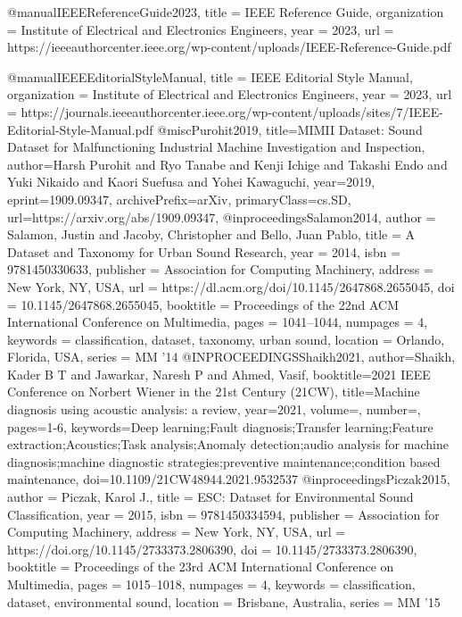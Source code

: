 @manual{IEEEReferenceGuide2023,
  title        = {IEEE Reference Guide},
  organization = {Institute of Electrical and Electronics Engineers},
  year         = {2023},
  url          = {https://ieeeauthorcenter.ieee.org/wp-content/uploads/IEEE-Reference-Guide.pdf}
}

@manual{IEEEEditorialStyleManual,
  title        = {IEEE Editorial Style Manual},
  organization = {Institute of Electrical and Electronics Engineers},
  year         = {2023},
  url          = {https://journals.ieeeauthorcenter.ieee.org/wp-content/uploads/sites/7/IEEE-Editorial-Style-Manual.pdf}
}
@misc{Purohit2019,
    title={MIMII Dataset: Sound Dataset for Malfunctioning Industrial Machine Investigation and Inspection}, 
    author={Harsh Purohit and Ryo Tanabe and Kenji Ichige and Takashi Endo and Yuki Nikaido and Kaori Suefusa and Yohei Kawaguchi},
    year={2019},
    eprint={1909.09347},
    archivePrefix={arXiv},
    primaryClass={cs.SD},
    url={https://arxiv.org/abs/1909.09347}, 
}%
@inproceedings{Salamon2014,
    author = {Salamon, Justin and Jacoby, Christopher and Bello, Juan Pablo},
    title = {A Dataset and Taxonomy for Urban Sound Research},
    year = {2014},
    isbn = {9781450330633},
    publisher = {Association for Computing Machinery},
    address = {New York, NY, USA},
    url = {https://dl.acm.org/doi/10.1145/2647868.2655045},
    doi = {10.1145/2647868.2655045},
    booktitle = {Proceedings of the 22nd ACM International Conference on Multimedia},
    pages = {1041–1044},
    numpages = {4},
    keywords = {classification, dataset, taxonomy, urban sound},
    location = {Orlando, Florida, USA},
    series = {MM '14}   
}%
@INPROCEEDINGS{Shaikh2021,
      author={Shaikh, Kader B T and Jawarkar, Naresh P and Ahmed, Vasif},
      booktitle={2021 IEEE Conference on Norbert Wiener in the 21st Century (21CW)}, 
      title={Machine diagnosis using acoustic analysis: a review}, 
      year={2021},
      volume={},
      number={},
      pages={1-6},
      keywords={Deep learning;Fault diagnosis;Transfer learning;Feature extraction;Acoustics;Task analysis;Anomaly detection;audio analysis for machine diagnosis;machine diagnostic strategies;preventive maintenance;condition based maintenance},
      doi={10.1109/21CW48944.2021.9532537}
}%
@inproceedings{Piczak2015,
    author = {Piczak, Karol J.},
    title = {ESC: Dataset for Environmental Sound Classification},
    year = {2015},
    isbn = {9781450334594},
    publisher = {Association for Computing Machinery},
    address = {New York, NY, USA},
    url = {https://doi.org/10.1145/2733373.2806390},
    doi = {10.1145/2733373.2806390},
    booktitle = {Proceedings of the 23rd ACM International Conference on Multimedia},
    pages = {1015–1018},
    numpages = {4},
    keywords = {classification, dataset, environmental sound},
    location = {Brisbane, Australia},
    series = {MM '15}
}%
